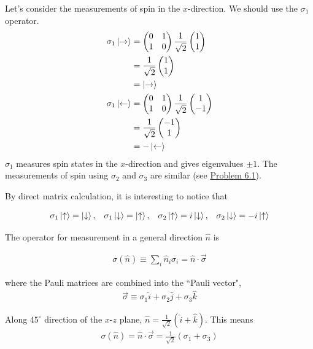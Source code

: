 \documentclass[12pt]{book} %
\numberwithin{equation}{chapter}
\def\s{\sigma}
\begin{document}
\begin{example}
Let's consider the measurements of spin in the $x$-direction. We should use the $\s_{1}$ operator.
\begin{align*}
\s_{1}\ket{\rightarrow}&=
\begin{pmatrix}
0&1\\
1&0
\end{pmatrix}
\frac{1}{\sqrt{2}}
\begin{pmatrix}
1\\
1
\end{pmatrix}\\
&=\frac{1}{\sqrt{2}}
\begin{pmatrix}
1\\
1
\end{pmatrix}\\
&=\ket{\rightarrow}\\
\s_{1}\ket{\leftarrow}&=
\begin{pmatrix}
0&1\\
1&0
\end{pmatrix}
\frac{1}{\sqrt{2}}
\begin{pmatrix}
1\\
-1
\end{pmatrix}\\
&=\frac{1}{\sqrt{2}}
\begin{pmatrix}
-1\\
1
\end{pmatrix}\\
&=-\ket{\leftarrow}
\end{align*}
$\s_{1}$ measures spin states in the $x$-direction and gives eigenvalues $\pm1$. The measurements of spin using $\s_{2}$ and $\s_{3}$ are similar (see \hyperref[Problem 6.1]{Problem 6.1}).
\end{example}
\noindent
By direct matrix calculation, it is interesting to notice that
\begin{eqnbox}
\begin{align}
\s_{1}\ket{\uparrow}=\ket{\downarrow}, &&\s_{1}\ket{\downarrow}=\ket{\uparrow}, &&\s_{2}\ket{\uparrow}=i\ket{\downarrow}, &&\s_{2}\ket{\downarrow}=-i\ket{\uparrow}
\end{align}
\end{eqnbox}
The operator for measurement in a general direction $\hat{n}$ is
\begin{eqnbox}
\begin{align}
\s(\hat{n})\equiv\sum_{i}\hat{n}_{i}\s_{i}=\hat{n}\cdot\vec{\s}
\end{align}
\end{eqnbox}
where the Pauli matrices are combined into the ``Pauli vector",
\begin{align*}
\vec{\s}\equiv\s_{1}\hat{i}+\s_{2}\hat{j}+\s_{3}\hat{k}
\end{align*}
\begin{example}
Along $45^\circ$ direction of the $x$-$z$ plane, $\hat{n}=\frac{1}{\sqrt{2}}\left(\hat{i}+\hat{k}\right)$. This means
\begin{align*}
\s(\hat{n})=\hat{n}\cdot\vec{\s}=\frac{1}{\sqrt{2}}\left(\s_{1}+\s_{3}\right)
\end{align*}
\end{example}
\end{document}
